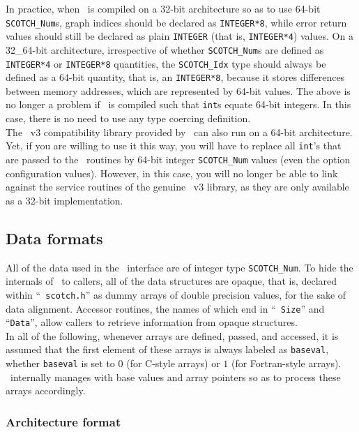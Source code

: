 In practice, when \scotch\ is compiled on a 32-bit architecture so as
to use 64-bit {\tt SCOTCH\_\lbt Num}s, graph indices should be
declared as {\tt INTEGER*8}, while error return values
should still be declared as plain {\tt INTEGER} (that is,
{\tt INTEGER*4}) values. On a 32\_64-bit architecture, irrespective of
whether {\tt SCOTCH\_\lbt Num}s are defined as {\tt INTEGER*4}
or {\tt INTEGER*8} quantities, the {\tt SCOTCH\_\lbt Idx} type
should always be defined as a 64-bit quantity, that is, an
{\tt INTEGER*8}, because it stores differences between memory
addresses, which are represented by 64-bit values.
The above is no longer a problem if \scotch\ is compiled such that
{\tt int}s equate 64-bit integers. In this case, there is no need to
use any type coercing definition.
\\

The \metis\ v3 compatibility library provided by \scotch\ can also
run on a 64-bit architecture. Yet, if you are willing to use it this
way, you will have to replace all {\tt int}'s that are passed to the
\metis\ routines by 64-bit integer {\tt SCOTCH\_\lbt Num} values (even
the option configuration values). However, in this case, you will no
longer be able to link against the service routines of the genuine
\metis\ v3 library, as they are only available as a 32-bit
implementation.

\subsection{Data formats}

All of the data used in the \libscotch\ interface are of integer type
{\tt SCOTCH\_Num}. To hide the internals of \scotch\ to callers, all
of the data structures are opaque, that is, declared within ``{\tt
scotch.h}'' as dummy arrays of double precision values, for the sake of
data alignment. Accessor routines, the names of which end in ``{\tt
Size}'' and ``{\tt Data}'', allow callers to retrieve information from
opaque structures.
\\

In all of the following, whenever arrays are defined, passed, and
accessed, it is assumed that the first element of these arrays is
always labeled as {\tt baseval}, whether {\tt baseval} is set to $0$
(for C-style arrays) or $1$ (for Fortran-style arrays). \scotch\
internally manages with base values and array pointers so as to
process these arrays accordingly.

\subsubsection{Architecture format}


